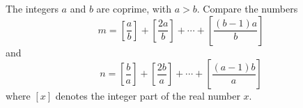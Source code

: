 The integers $a$ and $b$ are coprime, with $a > b$. Compare the numbers
\[
m = \left[\frac{a}{b}\right] + \left[\frac{2a}{b}\right] + \cdots + \left[\frac{(b-1)a}{b}\right]
\]
and
\[
n = \left[\frac{b}{a}\right] + \left[\frac{2b}{a}\right] + \cdots + \left[\frac{(a-1)b}{a}\right]
\]
where $[x]$ denotes the integer part of the real number $x$.

